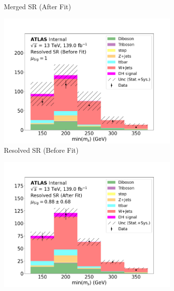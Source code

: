 \begin{figure}[h]
\begin{subfigure}{0.45\textwidth}
    \caption{Merged SR (After Fit)}\label{fig:after_SR_resolved_MonoSlep_monoSWWsemilep_zp2100_dm200_dh210}
  \end{subfigure} \vspace{1em}
  \begin{subfigure}{0.45\textwidth}
    \includegraphics[width=\textwidth]{Figures/8/MonoSlep_monoSWWsemilep_zp2100_dm200_dh210/SR_Resolved_before.pdf}
    \caption{Resolved SR (Before Fit)}\label{fig:before_SR_merged_MonoSlep_monoSWWsemilep_zp2100_dm200_dh210}
  \end{subfigure} \hspace{1em}
  \begin{subfigure}{0.45\textwidth}
    \includegraphics[width=\textwidth]{Figures/8/MonoSlep_monoSWWsemilep_zp2100_dm200_dh210/SR_Resolved_after.pdf}

\end{subfigure}
\end{figure}
